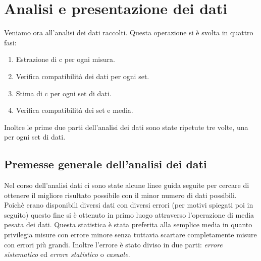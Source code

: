 \documentclass[a4paper,11pt]{article}
\begin{document}
	
	\section{Analisi e presentazione dei dati}
	Veniamo ora all'analisi dei dati raccolti. Questa operazione si è svolta in quattro fasi:
	
	\begin{enumerate}
		\item Estrazione di c per ogni misura.
		\item Verifica compatibilità dei dati per ogni set.
		\item Stima di c per ogni set di dati.
		\item Verifica compatibilità dei set e media.
	\end{enumerate}
	
	Inoltre le prime due parti dell'analisi dei dati sono state ripetute tre volte, una per ogni set di dati. 
	\subsection{Premesse generale dell'analisi dei dati}
	Nel corso dell'analisi dati ci sono state alcune linee guida seguite per cercare di ottenere il migliore risultato possibile con il minor numero di dati possibili. Poichè erano disponibili diversi dati con diversi errori (per motivi spiegati poi in seguito) questo fine si è ottenuto in primo luogo attraverso l'operazione di media pesata dei dati. Questa statistica è stata preferita alla semplice media in quanto privilegia misure con errore minore senza tuttavia scartare completamente misure con errori più grandi.
	Inoltre l'errore è stato diviso in due parti: \emph{errore sistematico} ed \emph{errore statistico} o \emph{casuale}.
\end{document}
